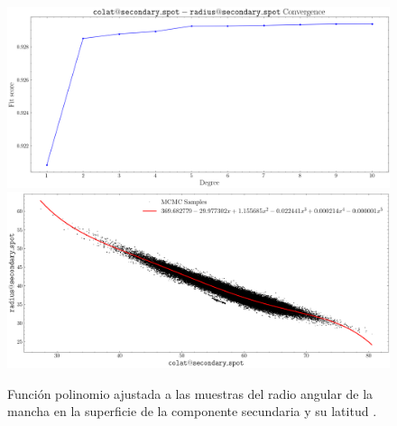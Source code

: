 \begin{figure}[!ht]
    \centering
    \includegraphics[scale=0.44]{Apendice/Figures/Figura radius@secondary_spot-colat@secondary_spot Correlacion Convergencia.png}
    \includegraphics[scale=0.44]{Apendice/Figures/Figura radius@secondary_spot-colat@secondary_spot Correlacion.png}
    \caption{Función polinomio ajustada a las muestras del radio angular de la
    mancha en la superficie de la componente secundaria
     y su latitud .}
\end{figure}